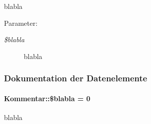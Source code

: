 blabla 

\begin{Desc}
\item[Parameter:]
\begin{description}
\item[{\em \$blabla}]blabla \end{description}
\end{Desc}


\subsubsection{Dokumentation der Datenelemente}
\hypertarget{classKommentar_fdf104e05a476d5c31598067b7f8f17d}{
\paragraph[\$blabla]{\setlength{\rightskip}{0pt plus 5cm}Kommentar::\$blabla = 0}\hfill}
\label{classKommentar_fdf104e05a476d5c31598067b7f8f17d}


blabla 

